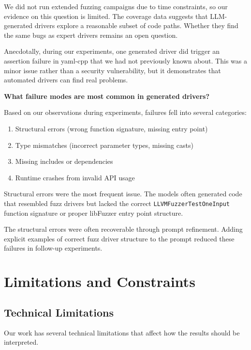 We did not run extended fuzzing campaigns due to time constraints, so our evidence on this question is limited. The coverage data suggests that LLM-generated drivers explore a reasonable subset of code paths. Whether they find the same bugs as expert drivers remains an open question.

Anecdotally, during our experiments, one generated driver did trigger an assertion failure in yaml-cpp that we had not previously known about. This was a minor issue rather than a security vulnerability, but it demonstrates that automated drivers can find real problems.

\textbf{What failure modes are most common in generated drivers?}

Based on our observations during experiments, failures fell into several categories:

\begin{enumerate}
    \item Structural errors (wrong function signature, missing entry point)
    \item Type mismatches (incorrect parameter types, missing casts)
    \item Missing includes or dependencies
    \item Runtime crashes from invalid API usage
\end{enumerate}

Structural errors were the most frequent issue. The models often generated code that resembled fuzz drivers but lacked the correct \texttt{LLVMFuzzerTestOneInput} function signature or proper libFuzzer entry point structure.

The structural errors were often recoverable through prompt refinement. Adding explicit examples of correct fuzz driver structure to the prompt reduced these failures in follow-up experiments.


\section{Limitations and Constraints}
\label{sec:discussion_limitations}

\subsection{Technical Limitations}
\label{sec:discussion_tech_limits}

Our work has several technical limitations that affect how the results should be interpreted.

